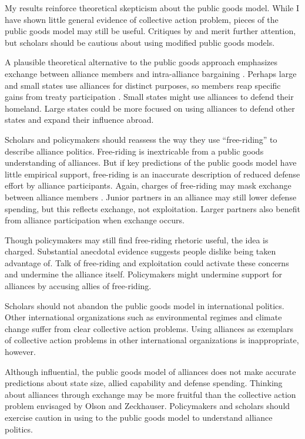 \documentclass[12pt]{article}
\begin{document}
My results reinforce theoretical skepticism about the public goods model. 
While I have shown little general evidence of collective action problem, pieces of the public goods model may still be useful. 
Critiques by \citet{Palmer1990} and \citet{SandlerHartley2001} merit further attention, but scholars should be cautious about using modified public goods models. 


A plausible theoretical alternative to the public goods approach emphasizes exchange between alliance members and intra-alliance bargaining \citep{Norrlof2010, Brooksetal2013, Kim2016}. 
Perhaps large and small states use alliances for distinct purposes, so members reap specific gains from treaty participation \citep{Morrow1991, Johnson2015}. 
Small states might use alliances to defend their homeland. 
Large states could be more focused on using alliances to defend other states and expand their influence abroad. 


Scholars and policymakers should reassess the way they use ``free-riding'' to describe alliance politics. 
Free-riding is inextricable from a public goods understanding of alliances.
But if key predictions of the public goods model have little empirical support, free-riding is an inaccurate description of reduced defense effort by alliance participants.  
Again, charges of free-riding may mask exchange between alliance members \citep{Lanoszka2015}. 
Junior partners in an alliance may still lower defense spending, but this reflects exchange, not exploitation. 
Larger partners also benefit from alliance participation when exchange occurs. 


Though policymakers may still find free-riding rhetoric useful, the idea is charged. 
Substantial anecdotal evidence suggests people dislike being taken advantage of. 
Talk of free-riding and exploitation could activate these concerns and undermine the alliance itself.
Policymakers might undermine support for alliances by accusing allies of free-riding. 


Scholars should not abandon the public goods model in international politics. 
Other international organizations such as environmental regimes and climate change suffer from clear collective action problems.  
Using alliances as exemplars of collective action problems in other international organizations is inappropriate, however. 


Although influential, the public goods model of alliances does not make accurate predictions about state size, allied capability and defense spending. 
Thinking about alliances through exchange may be more fruitful than the collective action problem envisaged by Olson and Zeckhauser.
Policymakers and scholars should exercise caution in using to the public goods model to understand alliance politics.  



\singlespace


 
\end{document}
